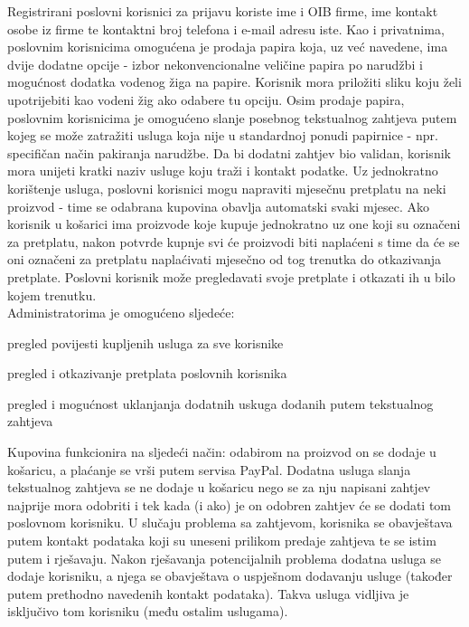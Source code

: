 		\noindent \normalsize{Registrirani poslovni korisnici za prijavu koriste ime i OIB firme, ime kontakt osobe iz firme te kontaktni broj telefona i e-mail adresu iste. Kao i privatnima, poslovnim korisnicima omogućena je prodaja papira koja, uz već navedene, ima dvije dodatne opcije - izbor nekonvencionalne veličine papira po narudžbi i mogućnost dodatka vodenog žiga na papire. Korisnik mora priložiti sliku koju želi upotrijebiti kao vodeni žig ako odabere tu opciju. Osim prodaje papira, poslovnim korisnicima je omogućeno slanje posebnog tekstualnog zahtjeva putem kojeg se može zatražiti usluga koja nije u standardnoj ponudi papirnice - npr. specifičan način pakiranja narudžbe. Da bi dodatni zahtjev bio validan, korisnik mora unijeti kratki naziv usluge koju traži i kontakt podatke. Uz jednokratno korištenje usluga, poslovni korisnici mogu napraviti mjesečnu pretplatu na neki proizvod - time se odabrana kupovina obavlja automatski svaki mjesec. Ako korisnik u košarici ima proizvode koje kupuje jednokratno uz one koji su označeni za pretplatu, nakon potvrde kupnje svi će proizvodi biti naplaćeni s time da će se oni označeni za pretplatu naplaćivati mjesečno od tog trenutka do otkazivanja pretplate. Poslovni korisnik može pregledavati svoje pretplate i otkazati ih u bilo kojem trenutku.} \\
		
		\noindent \normalsize{Administratorima je omogućeno sljedeće: } 
		\begin{packed_enum}
			\item \normalsize{pregled povijesti kupljenih usluga za sve korisnike}
			\item  \normalsize{pregled i otkazivanje pretplata poslovnih korisnika}
			\item  \normalsize{pregled i mogućnost uklanjanja dodatnih uskuga dodanih putem tekstualnog zahtjeva} \\
		\end{packed_enum}
	
		\noindent \normalsize{Kupovina funkcionira na sljedeći način: odabirom na proizvod on se dodaje u košaricu, a plaćanje se vrši putem servisa PayPal. Dodatna usluga slanja tekstualnog zahtjeva se ne dodaje u košaricu nego se za nju napisani zahtjev najprije mora odobriti i tek kada (i ako) je on odobren zahtjev će se dodati tom poslovnom korisniku. U slučaju problema sa zahtjevom, korisnika se obavještava putem kontakt podataka koji su uneseni prilikom predaje zahtjeva te se istim putem i rješavaju. Nakon rješavanja potencijalnih problema dodatna usluga se dodaje korisniku, a njega se obavještava o uspješnom dodavanju usluge (također putem prethodno navedenih kontakt podataka). Takva usluga vidljiva je isključivo tom korisniku (među ostalim uslugama). } \\
		
